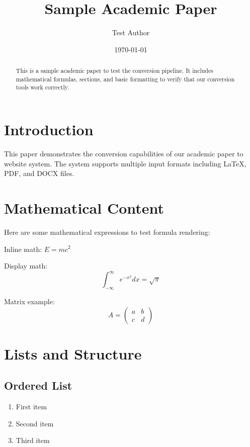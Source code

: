 \documentclass{article}
\title{Sample Academic Paper}
\author{Test Author}
\date{\today}
\begin{document}
\maketitle

\begin{abstract}
This is a sample academic paper to test the conversion pipeline. It includes mathematical formulas, sections, and basic formatting to verify that our conversion tools work correctly.
\end{abstract}

\section{Introduction}

This paper demonstrates the conversion capabilities of our academic paper to website system. The system supports multiple input formats including LaTeX, PDF, and DOCX files.

\section{Mathematical Content}

Here are some mathematical expressions to test formula rendering:

Inline math: $E = mc^2$

Display math:
\begin{equation}
\int_{-\infty}^{\infty} e^{-x^2} dx = \sqrt{\pi}
\end{equation}

Matrix example:
\begin{equation}
A = \begin{pmatrix}
a & b \\
c & d
\end{pmatrix}
\end{equation}

\section{Lists and Structure}

\subsection{Ordered List}
\begin{enumerate}
\item First item
\item Second item
\item Third item
\end{enumerate}
\end{document}
